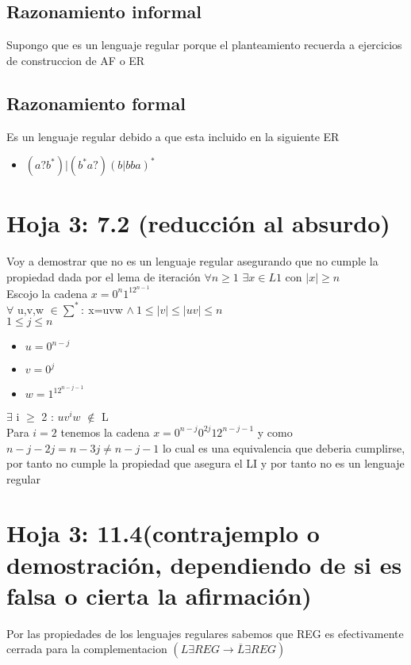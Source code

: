 \documentclass[11pt]{article}
\begin{document}
\subsection{Razonamiento informal}
Supongo que es un lenguaje regular porque el planteamiento recuerda a ejercicios de construccion de AF o ER
\subsection{Razonamiento formal}
Es un lenguaje regular debido a que esta incluido en la siguiente ER\\
\begin{itemize}
\item$(a?b^*)|(b^*a?)(b|bba)^*$\\
\end{itemize}
\section{Hoja 3: 7.2 (reducción al absurdo)}
Voy a demostrar que no es un lenguaje regular asegurando que no cumple la propiedad dada por el lema de iteración
$\forall n \geq 1$
$\exists x \in L1$ con $|x| \geq n$\\
Escojo la cadena $x = 0^n1^12^{n-1}$ \\

$\forall$ u,v,w $\in \sum^*:\ $x=uvw $\wedge\ 1 \leq |v| \leq |uv| \leq n$\\
$1 \leq j \leq n $
\begin{itemize}
\item$u = 0^{n-j}$
\item$v = 0^j$
\item$w = 1^12^{n-j-1}$
\end{itemize}
$\exists$ i $\geq$ 2 : $uv^iw$ $\notin$ L\\
Para $i = 2$ tenemos la cadena $x = 0^{n-j}0^{2j}12^{n-j-1}$ y como $n-j-2j = n -3j \neq n-j-1$ lo cual es una equivalencia que deberia cumplirse, por tanto no cumple la propiedad que asegura el LI y por tanto no es un lenguaje regular
\section{Hoja 3: 11.4(contrajemplo o demostración, dependiendo de si es falsa o cierta la afirmación)}
Por las propiedades de los lenguajes regulares sabemos que REG es efectivamente cerrada para la complementacion $(L \exists REG \xrightarrow{} \overline{L} \exists REG)$\\
\end{document}
